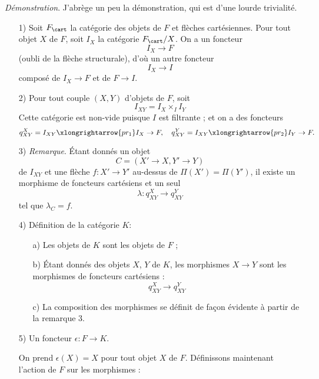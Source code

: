 {\it Démonstration}. J'abrège un peu la démonstration, qui est d'une lourde trivialité. 
\begin{enumerate}
    \item[1)] Soit $F_{\cart}$ la catégorie des objets de $F$ et flèches cartésiennes. Pour tout objet $X$ de $F$, soit $I_X$ la catégorie $F_{\cart}/X$. On a un foncteur
    $$
    I_X \to F
    $$
    (oubli de la flèche structurale), d'où un autre foncteur
    $$
    I_X \to I
    $$
    composé de $I_X \to F$ et de $F \to I$.
    \item[2)] Pour tout couple $(X, Y)$ d'objets de $F$, soit
    $$
    I_{XY} = I_{X} \times_I I_Y
    $$
    Cette catégorie est non-vide puisque $I$ est filtrante ; et on a des foncteurs 
    $$
    q^X_{XY} = I_{XY} \xlongrightarrow{pr_1} I_X \to F, \quad q^Y_{XY} = I_{XY} \xlongrightarrow{pr_2} I_Y \to F.
    $$
    \item[3)] \emph{Remarque}. Étant donnés un objet
    $$
    C = (X' \to X, Y' \to Y)
    $$
    de $I_{XY}$ et une flèche $f: X' \to Y'$ au-dessus de $\Pi(X') = \Pi(Y')$, il existe un morphisme de foncteurs cartésiens et un seul
    $$
    \lambda: q^X_{XY} \to q^Y_{XY}
    $$
    tel que $\lambda_C = f$.
    \item[4)] Définition de la catégorie $K$:
    \begin{enumerate}
        \item[a)] Les objets de $K$ sont les objets de $F$ ;
        \item[b)] Étant donnés des objets $X$, $Y$ de $K$, les morphismes $X \to Y$ sont les morphismes de foncteurs cartésiens :
        $$
        q^X_{XY} \to q^Y_{XY}
        $$
        \item[c)] La composition des morphismes se définit de fa\c{c}on évidente à partir de la remarque 3.
    \end{enumerate}
    \item[5)] Un foncteur $\epsilon: F \to K$. 
    
    On prend $\epsilon(X) = X$ pour tout objet $X$ de $F$. Définissons maintenant l'action de $F$ sur les morphismes :
    

\end{enumerate}
